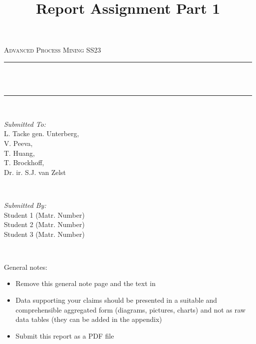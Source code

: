 \documentclass[12pt]{report}
\title{Report Assignment Part 1}
\author{}
\date{}
\makeatletter
\let\thetitle\@title
\makeatother
\begin{document}

\begin{titlepage}
	\centering
    \vspace*{0.5 cm}
  \begin{center}    
    \textsc{\Large Advanced Process Mining SS23}\\[2.0 cm]	
  \end{center}
	\rule{\linewidth}{0.2 mm} \\[0.4 cm]
	{ \huge \bfseries \thetitle}\\
	\rule{\linewidth}{0.2 mm} \\[1.5 cm]
	
  \begin{minipage}{0.48\textwidth}
    \begin{flushleft} \large
      \emph{Submitted To:}\\
      L. Tacke gen. Unterberg,\\
      V. Peeva,\\
      T. Huang,\\
      T. Brockhoff,\\ 
      Dr. ir. S.J. van Zelst\\
    \end{flushleft}
  \end{minipage}~
  \begin{minipage}{0.48\textwidth}
    \begin{flushright} \large
			\emph{Submitted By:} \\
      Student 1 (Matr. Number) \\
      Student 2 (Matr. Number) \\
      Student 3 (Matr. Number) 
		\end{flushright}
	\end{minipage}\\[2 cm]
\end{titlepage}



General notes:
\begin{itemize}
  \item Remove this general note page and the text in \textlangle \textrangle
  \item	Data supporting your claims should be presented in a suitable and comprehensible aggregated form (diagrams, pictures, charts) and not as raw data tables (they can be added in the appendix)
  \item Submit this report as a PDF file
\end{itemize}
\newpage
\end{document}
